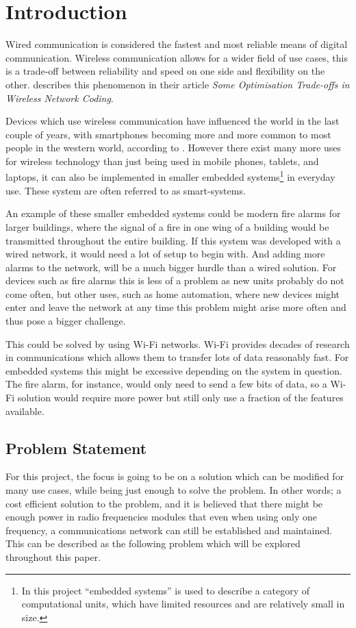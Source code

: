 \chapter{Introduction}
\vspace{-20pt}
Wired communication is considered the fastest and most reliable means of digital communication.
Wireless communication allows for a wider field of use cases, this is a trade-off between reliability and speed on one side and flexibility on the other. 
\citet{wirelessTradeoffs} describes this phenomenon in their article \emph{Some Optimisation Trade-offs in Wireless Network Coding}.

Devices which use wireless communication have influenced the world in the last couple of years, with smartphones becoming more and more common to most people in the western world, according to \citet{2013-SmartPhoneUse}.
However there exist many more uses for wireless technology than just being used in mobile phones, tablets, and laptops, it can also be implemented in smaller embedded systems\footnote{In this project \enquote{embedded systems} is used to describe a category of computational units, which have limited resources and are relatively small in size. } in everyday use.
These system are often referred to as smart-systems.

An example of these smaller embedded systems could be modern fire alarms for larger buildings, where the signal of a fire in one wing of a building would be transmitted throughout the entire building.
If this system was developed with a wired network, it would need a lot of setup to begin with.
And adding more alarms to the network, will be a much bigger hurdle than a wired solution. 
For devices such as fire alarms this is less of a problem as new units probably do not come often, but other uses, such as home automation, where new devices might enter and leave the network at any time this problem might arise more often and thus pose a bigger challenge.

This could be solved by using Wi-Fi networks.
Wi-Fi provides decades of research in communications which allows them to transfer lots of data reasonably fast.
For embedded systems this might be excessive depending on the system in question.
The fire alarm, for instance, would only need to send a few bits of data, so a Wi-Fi solution would require more power but still only use a fraction of the features available.

\newpage
\section{Problem Statement}\label{sec:problemStatement}
For this project, the focus is going to be on a solution which can be modified for many use cases, while being just enough to solve the problem.
In other words; a cost efficient solution to the problem, and it is believed that there might be enough power in radio frequencies modules that even when using only one frequency, a communications network can still be established and maintained.
This can be described as the following problem which will be explored throughout this paper.

